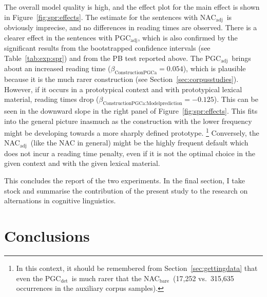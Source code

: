 \documentclass[USenglish]{article}
\newcommand{\Sub}[1]{\ensuremath{\mathrm{_{#1}}}}
\newcommand{\NACb}{NAC\Sub{bare}}
\newcommand{\NACa}{NAC\Sub{adj}}
\newcommand{\PGCd}{PGC\Sub{det}}
\newcommand{\PGCa}{PGC\Sub{adj}}
\begin{document}
The overall model quality is high, and the effect plot for the main effect is shown in Figure~\ref{fig:spr:effects}.
The estimate for the sentences with \NACa\ is obviously imprecise, and no differences in reading times are observed.
There is a clearer effect in the sentences with \PGCa, which is also confirmed by the significant results from the bootstrapped confidence intervals (see Table~\ref{tab:exp:spr}) and from the PB test reported above.
The \PGCa\ brings about an increased reading time ($\beta_{\text{ConstructionPGCa}}=0.054$), which is plausible because it is the much rarer construction (see Section~\ref{sec:corpusstudies}).
However, if it occurs in a prototypical context and with prototypical lexical material, reading times drop ($\beta_{\text{ConstructionPGCa:Modelprediction}}=-0.125$).
This can be seen in the downward slope in the right panel of Figure~\ref{fig:spr:effects}.
This fits into the general picture inasmuch as the construction with the lower frequency might be developing towards a more sharply defined prototype.%
\footnote{In this context, it should be remembered from Section~\ref{sec:gettingdata} that even the \PGCd\ is much rarer that the \NACb\ (17,252 vs.\ 315,635 occurrences in the auxiliary corpus samples).}
Conversely, the \NACa\ (like the NAC in general) might be the highly frequent default which does not incur a reading time penalty, even if it is not the optimal choice in the given context and with the given lexical material.

This concludes the report of the two experiments.
In the final section, I take stock and summarise the contribution of the present study to the research on alternations in cognitive linguistics.




\section{Conclusions}
\label{sec:conclusion}
\end{document}
